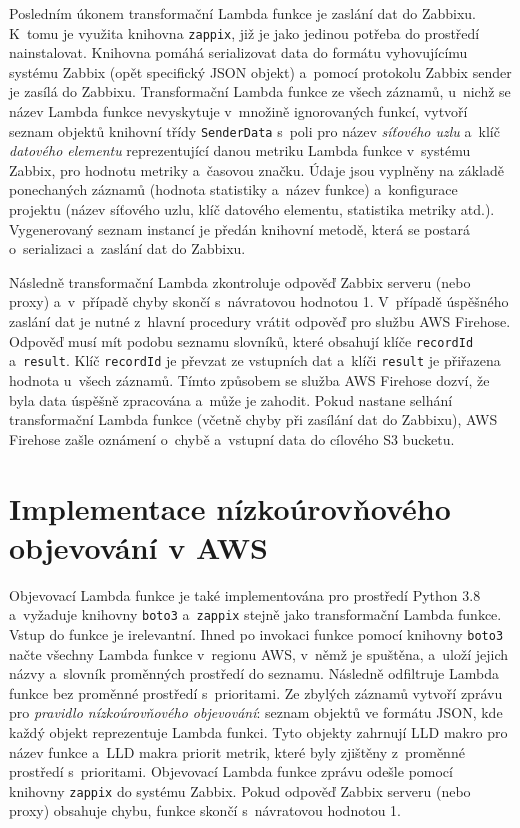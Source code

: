 \documentclass[czech, ing, kiv, he, iso690]{fasthesis}
\begin{document}
Posledním úkonem transformační Lambda funkce je zaslání dat do Zabbixu. K~tomu je využita knihovna \verb|zappix|, již je jako jedinou potřeba do prostředí nainstalovat. Knihovna pomáhá serializovat data do formátu vyhovujícímu systému Zabbix (opět specifický JSON objekt) a~pomocí protokolu Zabbix sender je zasílá do Zabbixu. Transformační Lambda funkce ze všech záznamů, u~nichž se název Lambda funkce nevyskytuje v~množině ignorovaných funkcí, vytvoří seznam objektů knihovní třídy \verb|SenderData| s~poli pro název \emph{síťového uzlu} a~klíč \emph{datového elementu} reprezentující danou metriku Lambda funkce v~systému Zabbix, pro hodnotu metriky a~časovou značku. Údaje jsou vyplněny na základě ponechaných záznamů (hodnota statistiky a~název funkce) a~konfigurace projektu (název síťového uzlu, klíč datového elementu, statistika metriky atd.). Vygenerovaný seznam instancí je předán knihovní metodě, která se postará o~serializaci a~zaslání dat do Zabbixu.

Následně transformační Lambda zkontroluje odpověď Zabbix serveru (nebo proxy) a~v~případě chyby skončí s~návratovou hodnotou 1. V~případě úspěšného zaslání dat je nutné z~hlavní procedury vrátit odpověď pro službu AWS Firehose. Odpověď musí mít podobu seznamu slovníků, které obsahují klíče \verb|recordId| a~\verb|result|. Klíč \verb|recordId| je převzat ze vstupních dat a~klíči \verb|result| je přiřazena hodnota  u~všech záznamů. Tímto způsobem se služba AWS Firehose dozví, že byla data úspěšně zpracována a~může je zahodit. Pokud nastane selhání transformační Lambda funkce (včetně chyby při zasílání dat do Zabbixu), AWS Firehose zašle oznámení o~chybě a~vstupní data do cílového S3 bucketu.

\section{Implementace nízkoúrovňového objevování v AWS}
\label{sec:lld-aws}

Objevovací Lambda funkce je také implementována pro prostředí Python 3.8 a~vyžaduje knihovny \verb|boto3| a~\verb|zappix| stejně jako transformační Lambda funkce. Vstup do funkce je irelevantní. Ihned po invokaci funkce pomocí knihovny \verb|boto3| načte všechny Lambda funkce v~regionu AWS, v~němž je spuštěna, a~uloží jejich názvy a~slovník proměnných prostředí do seznamu. Následně odfiltruje Lambda funkce bez proměnné prostředí s~prioritami. Ze zbylých záznamů vytvoří zprávu pro \emph{pravidlo nízkoúrovňového objevování}: seznam objektů ve formátu JSON, kde každý objekt reprezentuje Lambda funkci. Tyto objekty zahrnují LLD makro pro název funkce a~LLD makra priorit metrik, které byly zjištěny z~proměnné prostředí s~prioritami. Objevovací Lambda funkce zprávu odešle pomocí knihovny \verb|zappix| do systému Zabbix. Pokud odpověď Zabbix serveru (nebo proxy) obsahuje chybu, funkce skončí s~návratovou hodnotou 1. 
\end{document}
